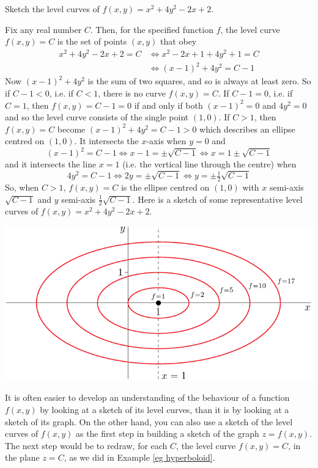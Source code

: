 \bigskip
\begin{eg}[$f(x,y) = x^2+4y^2-2x+2$]
\medskip
Sketch the level curves of $f(x,y) = x^2+4y^2-2x+2$. 

\soln  
Fix any real number $C$. Then, for the specified function $f$,
the level curve $f(x,y)=C$ is the set of points $(x,y)$ that obey
\begin{align*}
x^2+4y^2-2x+2=C
&\iff x^2-2x+1 + 4y^2 +1 =C \\
&\iff (x-1)^2 + 4y^2 = C-1
\end{align*}
Now $(x-1)^2 + 4y^2$ is the sum of two squares, and so is always at least zero. 
So if $C-1<0$, i.e. if $C<1$, there is no curve $f(x,y)=C$. If $C-1=0$, 
i.e. if $C=1$, then $f(x,y)=C-1=0$ if and only if both $(x-1)^2=0$ and 
$4y^2=0$ and so the level curve consists of the single point $(1,0)$. 
If $C>1$, then $f(x,y)=C$ become $(x-1)^2+4y^2=C-1>0$ which describes an
ellipse centred on $(1,0)$. It intersects the $x$-axis when $y=0$ and 
\begin{equation*}
(x-1)^2 = C-1 \iff x-1=\pm\sqrt{C-1} \iff x=1\pm \sqrt{C-1} 
\end{equation*}
and it intersects the line $x=1$ (i.e. the vertical line through the centre)
when 
\begin{equation*}
4y^2 = C-1 \iff 2y=\pm\sqrt{C-1} \iff y=\pm\tfrac{1}{2} \sqrt{C-1} 
\end{equation*}
So, when $C>1$, $f(x,y)=C$ is the ellipse centred on $(1,0)$ with 
$x$ semi-axis $\sqrt{C-1} $ and $y$ semi-axis $\tfrac{1}{2}\sqrt{C-1}$.
Here is a sketch of some representative level curves of 
$f(x,y) = x^2+4y^2-2x+2$.
\begin{efig}
\begin{center}
   \includegraphics{ellipseLevelB.pdf}
\end{center}
\end{efig}
It is often easier to develop an understanding of the behaviour of a function
$f(x,y)$ by looking at a sketch of its level curves, than it is by looking
at a sketch of its graph. On the other hand, you can also
use a sketch of the level curves of $f(x,y)$ as the first step in building
a sketch of the graph $z=f(x,y)$. The next step would be to redraw, 
for each $C$, the level curve $f(x,y)=C$, in the plane $z=C$, as we did in 
Example \ref{eg hyperboloid}.

\end{eg}


